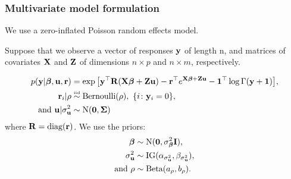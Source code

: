 \documentclass{beamer}
\begin{document}
\begin{frame}
	\frametitle{Multivariate model formulation}
	We use a zero-inflated Poisson random effects model.
						
	\medskip
						
	Suppose that we observe a vector of responses ${\bf y}$ of length n, and matrices
	of covariates ${\bf X}$ and ${\bf Z}$ of dimensions $n \times p$ and $n \times m$,
	respectively.
						
	\begin{align*}
		p({\bf y}|{\boldsymbol \beta}, {\bf u}, {\bf r})       & = \exp{\left[{\bf y}^\top {\bf R}({\bf X}{\boldsymbol\beta}+ {\bf Z}{\bf u}) - {\bf r}^\top e^{{\bf X}{\boldsymbol\beta}+ {\bf Z}{\bf u}} - {\bf1}^\top \log{\Gamma({\bf y}+ {\bf1})}\right]}, \\
		{\bf r}_i|\rho                    & \stackrel{\mbox{\tiny iid}}{\sim} \text{Bernoulli}(\rho), \ \{i \colon {\bf y}_i=0\},                                       \\
		\text{and }{\bf u}|\sigma_{{\bf u}}^2 & \sim \text{N}({\bf 0}, {\boldsymbol \Sigma})                                                                                    \\
	\end{align*}
	\noindent where ${\bf R} =\mbox{diag}({\bf r})$.
	We use the priors:
	\begin{align*}
		{\boldsymbol\beta}          & \sim \text{N}({\bf 0}, \sigma_{\boldsymbol \beta}^2{\bf I}),                  \\
		\sigma_{\bf u}^2    & \sim \text{IG}(\alpha_{\sigma_{\bf u}^2}, \beta_{\sigma_{\bf u}^2}), \\
		\text{and }\rho & \sim \text{Beta}(a_\rho, b_\rho).                             \\
	\end{align*}
\end{frame}
\end{document}
